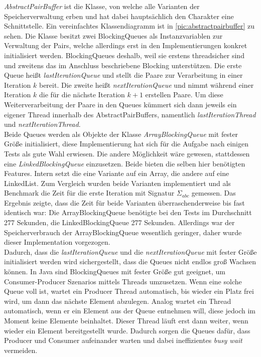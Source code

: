 \documentclass[12pt,a4paper]{article}
\begin{document}
\textit{AbstractPairBuffer} ist die Klasse, von welche alle Varianten der Speicherverwaltung erben und hat dabei hauptsächlich den Charakter eine Schnittstelle. Ein vereinfachtes Klassendiagramm ist in \autoref{pic:abstractpairbuffer} zu sehen. Die Klasse besitzt zwei BlockingQueues als Instanzvariablen zur Verwaltung der Pairs, welche allerdings erst in den Implementierungen konkret initialisiert werden.  BlockingQueues deshalb, weil sie erstens threadsicher sind und zweitens das im Anschluss beschriebene Blocking unterstützen. Die erste Queue heißt \textit{lastIterationQueue} und stellt  die Paare zur Verarbeitung in einer Iteration $k$ bereit. Die zweite heißt \textit{nextIterationQueue} und nimmt während einer Iteration $k$ die für die nächste Iteration $k+1$ erstellen Paare. Um diese Weiterverarbeitung der Paare in den Queues kümmert sich dann jeweils ein eigener Thread innerhalb des AbstractPairBuffers, namentlich \textit{lastIterationThread} und \textit{nextIterationThread}. \\
Beide Queues werden als Objekte der Klasse \textit{ArrayBlockingQueue} mit fester Größe initialisiert, diese Implementierung hat sich für die Aufgabe nach einigen Tests als gute Wahl erwiesen. Die andere Möglichkeit wäre gewesen, stattdessen eine \textit{LinkedBlockingQueue} einzusetzen. Beide bieten die selben hier benötigten Features. Intern setzt die eine Variante auf ein Array, die andere auf eine LinkedList. Zum Vergleich wurden beide Varianten implementiert und als Benchmark die Zeit für die erste Iteration mit Signatur $\Sigma_{abc}$ gemessen. Das Ergebnis zeigte, dass die Zeit für beide Varianten überraschenderweise bis fast identisch war: Die ArrayBlockingQueue benötigte bei den Tests im Durchschnitt 277 Sekunden, die LinkedBlockingQueue 277 Sekunden. Allerdings war der Speicherverbrauch der ArrayBlockingQueue wesentlich geringer, daher wurde dieser Implementation vorgezogen. \\
Dadurch, dass die \textit{lastIterationQueue} und die \textit{nextIterationQueue} mit fester Größe initialisiert werden wird sichergestellt, dass die Queues nicht endlos groß Wachsen können. In Java sind BlockingQueues mit fester Größe gut geeignet, um Consumer-Producer Szenarios  mittels Threads umzusetzen. Wenn eine solche Queue voll ist, wartet ein Producer Thread automatisch, bis wieder ein Platz frei wird, um dann das nächste Element abzulegen. Analog wartet ein Thread automatisch, wenn er ein Element aus der Queue entnehmen will, diese jedoch im Moment keine Elemente beinhaltet. Dieser Thread läuft erst dann weiter, wenn wieder ein Element bereitgestellt wurde. Dadurch sorgen die Queues dafür, dass Producer und Consumer aufeinander warten und dabei ineffizientes \textit{busy wait} vermeiden.\\
\end{document}
